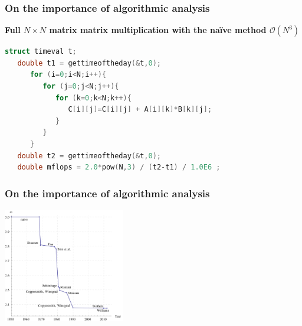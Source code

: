 \begin{frame}[containsverbatim]
\frametitle{On the importance of algorithmic analysis}
\textbf{Full $N \times N $ matrix matrix multiplication with the naïve method $\mathcal{O}(N^3)$}
\begin{lstlisting}[language=C,frame=lines]
   struct timeval t;
   double t1 = gettimeoftheday(&t,0);
      for (i=0;i<N;i++){
         for (j=0;j<N;j++){
            for (k=0;k<N;k++){
               C[i][j]=C[i][j] + A[i][k]*B[k][j];
            }
         }
      }
   double t2 = gettimeoftheday(&t,0);
   double mflops = 2.0*pow(N,3) / (t2-t1) / 1.0E6 ;
\end{lstlisting}
\end{frame}

\begin{frame}[containsverbatim]
\frametitle{On the importance of algorithmic analysis}
\begin{center}
        {\includegraphics[height=5cm]{Day0/images/dgemm-complexity.png}}
\end{center}
\end{frame}


%




